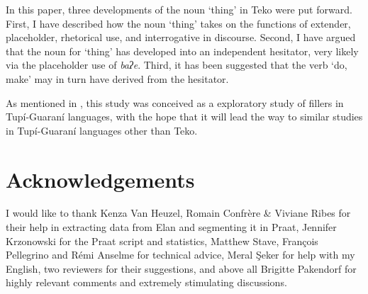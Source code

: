 \documentclass[output=paper]{langscibook}
\begin{document}

In this paper, three developments of the noun ‘thing’ in Teko were put forward. First, I have described how the noun ‘thing’ takes on the functions of extender, placeholder, rhetorical use, and interrogative in discourse. Second, I have argued that the noun for ‘thing’ has developed into an independent hesitator, very likely via the placeholder use of \textit{baʔe}. Third, it has been suggested that the verb ‘do, make’ may in turn have derived from the hesitator. 

As mentioned in , this study was conceived as a exploratory study of fillers in Tupí-Guaraní languages, with the hope that it will lead the way to  similar studies in Tupí-Guaraní languages other than Teko.

\section*{Acknowledgements}

I would like to thank Kenza Van Heuzel, Romain Confrère \& Viviane Ribes for their help in extracting data from Elan and segmenting it in Praat, Jennifer Krzonowski for the Praat script and statistics, Matthew Stave, François Pellegrino and Rémi Anselme for technical advice, Meral Şeker for help with my English, two reviewers for their suggestions, and above all Brigitte Pakendorf for highly relevant comments and extremely stimulating discussions.
\end{document}
